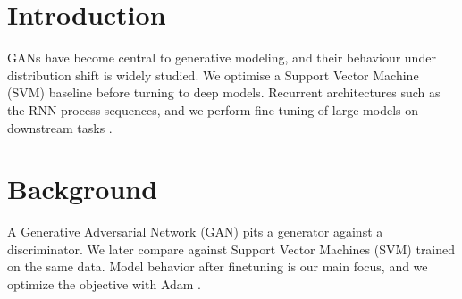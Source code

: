 \documentclass{article}
\begin{document}
\section{Introduction}
GANs have become central to generative modeling, and their behaviour under
distribution shift is widely studied. We optimise a Support Vector Machine (SVM)
baseline before turning to deep models. Recurrent architectures such as the RNN
process sequences, and we perform fine-tuning of large models on downstream tasks
\cite{krizhevsky2017}.

\section{Background}
A Generative Adversarial Network (GAN) pits a generator against a discriminator.
We later compare against Support Vector Machines (SVM) trained on the same data.
Model behavior after finetuning is our main focus, and we optimize the objective
with Adam \cite{he2016}.
\end{document}

